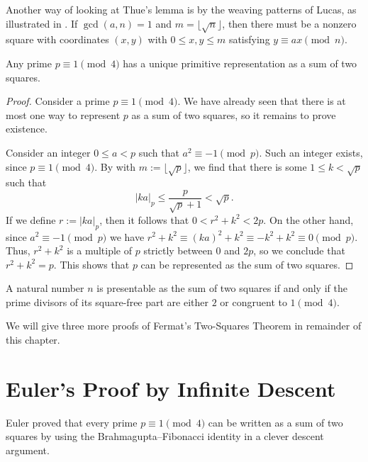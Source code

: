 Another way of looking at Thue's lemma is by the weaving patterns of Lucas, as illustrated in . If $\gcd(a,n)=1$ and $m=\lfloor\sqrt{n}\rfloor$, then there must be a nonzero square with coordinates $(x,y)$ with $0\leq x,y\leq m$ satisfying $y\equiv ax\pmod{n}$. 

\begin{theorem}\label{theorem:two-squares-primes}
  Any prime $p\equiv 1\pmod{4}$ has a unique primitive representation as a sum of two squares.
\end{theorem}

\begin{proof}
  Consider a prime $p\equiv 1\pmod{4}$. We have already seen that there is at most one way to represent $p$ as a sum of two squares, so it remains to prove existence.

  Consider an integer $0\leq a<p$ such that $a^2\equiv -1\pmod{p}$. Such an integer exists, since $p\equiv 1\pmod{4}$. By  with $m:=\lfloor\sqrt{p}\rfloor$, we find that there is some $1\leq k<\sqrt{p}$ such that
  \begin{equation*}
    |ka|_p\leq \frac{p}{\sqrt{p}+1}<\sqrt{p}.
  \end{equation*}
  If we define $r:=|ka|_p$, then it follows that $0<r^2+k^2<2p$. On the other hand, since $a^2\equiv-1\pmod{p}$ we have $r^2+k^2\equiv (ka)^2+k^2\equiv -k^2+k^2\equiv 0\pmod{p}$. Thus, $r^2+k^2$ is a multiple of $p$ strictly between $0$ and $2p$, so we conclude that $r^2+k^2=p$. This shows that $p$ can be represented as the sum of two squares.
\end{proof}

\begin{theorem}\label{theorem:two-squares-theorem}
  A natural number $n$ is presentable as the sum of two squares if and only if the prime divisors of its square-free part are either $2$ or congruent to $1\pmod{4}$.
\end{theorem}

We will give three more proofs of Fermat's Two-Squares Theorem in remainder of this chapter.

\section{Euler's Proof by Infinite Descent}

Euler proved that every prime $p\equiv 1\pmod{4}$ can be written as a sum of two squares by using the Brahmagupta--Fibonacci identity in a clever descent argument.

